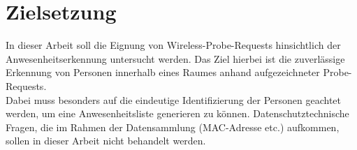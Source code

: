 \section{Zielsetzung}

In dieser Arbeit soll die Eignung von Wireless-Probe-Requests hinsichtlich der Anwesenheitserkennung untersucht werden.
Das Ziel hierbei ist die zuverlässige Erkennung von Personen innerhalb eines Raumes anhand aufgezeichneter Probe-Requests.
\\

Dabei muss besonders auf die eindeutige Identifizierung der Personen geachtet werden, um eine Anwesenheitsliste generieren zu können.
Datenschutztechnische Fragen, die im Rahmen der Datensammlung (MAC-Adresse etc.) aufkommen, sollen in dieser Arbeit nicht behandelt werden.